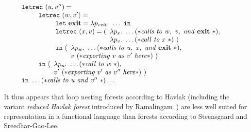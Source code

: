 \begin{description}
    \begin{equation}
    \begin{array}{l}
      \mathtt{letrec}\ (u,v'') = \\ \qquad 
        \begin{array}{l}
          \mathtt{letrec}\ (w,v') =\\ \qquad
            \begin{array}{l}
              \mathtt{let}\ \exitnode =
                     \lambda p_{\mathit{exit}}.\ \ldots\ \mathtt{in}\\
              \mathtt{letrec}\ (x,v) = 
                (\begin{array}[t]{l}
                   \lambda p_x.\ \ldots (*\mathit{calls\ to\ w,\ 
                                          v,\ and\ \exitnode}\ *),\\
                   \lambda p_v.\ \ldots (*\mathit{call\ to\ x}\ *)\ )
                 \end{array}\\
              \mathtt{in}\
                (\begin{array}[t]{l}
                   \lambda p_w.\ \ldots (*\mathit{calls\ to\ u,\ 
                                          x,\ and\ \exitnode}\ *),\\
                   v\ (*\mathit{exporting}\ v\ \mathit{as}\ 
                         v'\ \mathit{here}*)\ )
                 \end{array}
            \end{array}\\
          \mathtt{in}\
             ( \begin{array}[t]{l}
                 \lambda p_u.\ \ldots (*\mathit{call\ to\ w}\ *),\\
                  v'\ (*\mathit{exporting}\ v'\ \mathit{as}\ 
                        v''\ \mathit{here}*)\ )
               \end{array}
        \end{array}\\
      \mathtt{in}\ \ldots (*\mathit{calls\ to\ u\ and\ v''}\ *) \ldots
    \end{array}
  \end{equation} 

  It thus appears that loop nesting forests according to Havlak
  (including the variant \emph{reduced Havlak forest} introduced by
  Ramalingam~\cite{DBLP:journals/toplas/Ramalingam02}) are less well
  suited for representation in a functional language than forests
  according to Steensgaard and Sreedhar-Gao-Lee.  
\end{description}
